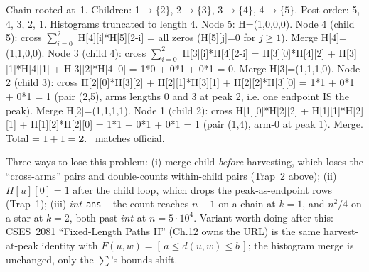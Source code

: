 \begin{tracebox}[Sample~2: $n=5$, $k=3$, edges $1\!-\!2,2\!-\!3,3\!-\!4,4\!-\!5$ $\Rightarrow$ 2]
Chain rooted at~1. Children: 1$\to$$\{2\}$, 2$\to$$\{3\}$, 3$\to$$\{4\}$,
4$\to$$\{5\}$. Post-order: 5, 4, 3, 2, 1. Histograms truncated to length 4.
Node 5: H=(1,0,0,0).
Node 4 (child 5): cross $\sum_{i=0}^{2}$ H[4][i]*H[5][2-i] = all zeros
  (H[5][j]=0 for $j\ge 1$). Merge H[4]=(1,1,0,0).
Node 3 (child 4): cross $\sum_{i=0}^{2}$ H[3][i]*H[4][2-i] = H[3][0]*H[4][2]
  + H[3][1]*H[4][1] + H[3][2]*H[4][0] = 1*0 + 0*1 + 0*1 = 0. Merge
  H[3]=(1,1,1,0).
Node 2 (child 3): cross H[2][0]*H[3][2] + H[2][1]*H[3][1] + H[2][2]*H[3][0]
  = 1*1 + 0*1 + 0*1 = 1 (pair (2,5), arms lengths 0 and 3 at peak 2,
  i.e. one endpoint IS the peak). Merge H[2]=(1,1,1,1).
Node 1 (child 2): cross H[1][0]*H[2][2] + H[1][1]*H[2][1] + H[1][2]*H[2][0]
  = 1*1 + 0*1 + 0*1 = 1 (pair (1,4), arm-0 at peak 1). Merge.
Total = $1 + 1 = \mathbf{2}$. \checkmark\ matches official.
\end{tracebox}


\begin{warningbox}
Three ways to lose this problem: (i) merge child \emph{before} harvesting,
which loses the ``cross-arms'' pairs and double-counts within-child pairs
(Trap~2 above); (ii) $\mathit{H}[u][0]=1$ after the child loop, which
drops the peak-as-endpoint rows (Trap~1); (iii) $\mathit{int}$ \lstinline{ans}
-- the count reaches $n-1$ on a chain at $k=1$, and $n^2/4$ on a star at
$k=2$, both past $\mathit{int}$ at $n=5\cdot 10^{4}$. Variant worth doing
after this: CSES~2081 ``Fixed-Length Paths II'' (Ch.12 owns the URL) is
the same harvest-at-peak identity with $F(u,w)=[\,a\le d(u,w)\le b\,]$;
the histogram merge is unchanged, only the $\sum$'s bounds shift.
\end{warningbox}

